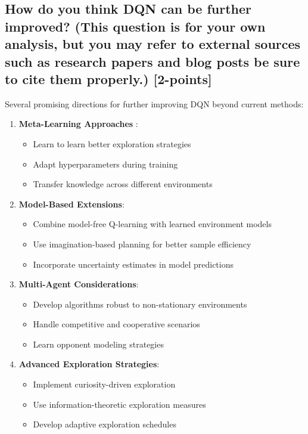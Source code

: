 \documentclass[12pt]{article}
\begin{document}
{{{\subsection{How do you think DQN can be further improved? (This question is for your own analysis, but you may refer to external sources such as research papers and blog posts be sure to cite them properly.) [2-points]}

Several promising directions for further improving DQN beyond current methods:

\begin{enumerate}
    \item \textbf{Meta-Learning Approaches} \cite{wang2016learning}:
    \begin{itemize}
        \item Learn to learn better exploration strategies
        \item Adapt hyperparameters during training
        \item Transfer knowledge across different environments
    \end{itemize}
    
    \item \textbf{Model-Based Extensions}:
    \begin{itemize}
        \item Combine model-free Q-learning with learned environment models
        \item Use imagination-based planning for better sample efficiency
        \item Incorporate uncertainty estimates in model predictions
    \end{itemize}
    
    \item \textbf{Multi-Agent Considerations}:
    \begin{itemize}
        \item Develop algorithms robust to non-stationary environments
        \item Handle competitive and cooperative scenarios
        \item Learn opponent modeling strategies
    \end{itemize}
    
    \item \textbf{Advanced Exploration Strategies}:
    \begin{itemize}
        \item Implement curiosity-driven exploration \cite{pathak2017curiosity}
        \item Use information-theoretic exploration measures
        \item Develop adaptive exploration schedules
    \end{itemize}
    

\end{enumerate}}}}
\end{document}
